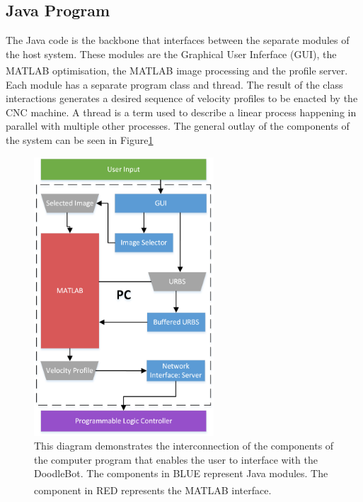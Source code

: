 \subsection{Java Program}
The Java code is the backbone that interfaces between the separate modules of the host system. These modules are the Graphical User Inferface (GUI), the MATLAB\textsuperscript{\textregistered} optimisation, the MATLAB\textsuperscript{\textregistered} image processing and the profile server. Each module has a separate program class and thread. The result of the class interactions generates a desired sequence of velocity profiles to be enacted by the CNC machine. A thread is a term used to describe a linear process happening in parallel with multiple other processes. The general outlay of the components of the system can be seen in Figure\ref{fig:javaOverview}


\begin{figure}[htbp] 
\centering
\includegraphics[width=0.6\textwidth]{figures/implementation/humanMachineInterface/systemDiagram2.png}
\caption[Human Machine Interface System Diagram]{This diagram demonstrates the interconnection of the components of the computer program that enables the user to interface with the DoodleBot. The components in BLUE represent Java modules. The component in RED represents the MATLAB\textsuperscript{\textregistered} interface.
\label{fig:javaOverview}}
\end{figure}

